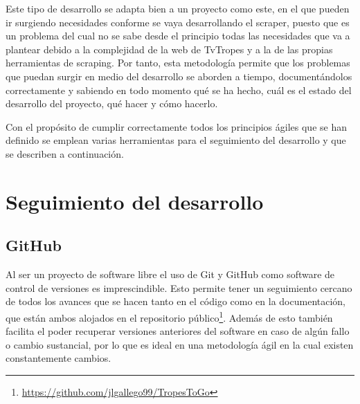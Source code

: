 Este tipo de desarrollo se adapta bien a un proyecto como este, en el que pueden ir surgiendo necesidades conforme se vaya desarrollando el scraper, puesto que es un problema del cual no se sabe desde el principio todas las necesidades que va a plantear debido a la complejidad de la web de TvTropes y a la de las propias herramientas de scraping. Por tanto, esta metodología permite que los problemas que puedan surgir en medio del desarrollo se aborden a tiempo, documentándolos correctamente y sabiendo en todo momento qué se ha hecho, cuál es el estado del desarrollo del proyecto, qué hacer y cómo hacerlo.

Con el propósito de cumplir correctamente todos los principios ágiles que se han definido se emplean varias herramientas para el seguimiento del desarrollo y que se describen a continuación.

\section{Seguimiento del desarrollo}
\subsection{GitHub}
Al ser un proyecto de software libre el uso de Git y GitHub como software de control de versiones es imprescindible. Esto permite tener un seguimiento cercano de todos los avances que se hacen tanto en el código como en la documentación, que están ambos alojados en el repositorio público\footnote{\url{https://github.com/jlgallego99/TropesToGo}}. Además de esto también facilita el poder recuperar versiones anteriores del software en caso de algún fallo o cambio sustancial, por lo que es ideal en una metodología ágil en la cual existen constantemente cambios.

